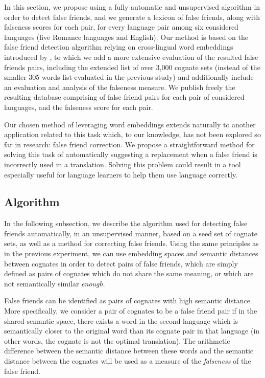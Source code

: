 \documentclass[output=paper]{langsci/langscibook}
\begin{document}
In this section, we propose using a fully automatic and unsupervised algorithm in order to detect false friends, and we generate a lexicon of false friends, along with falseness scores for each pair, for every language pair among six considered languages (five Romance languages and English). Our method is based on the false friend detection algorithm relying on cross-lingual word embeddings introduced by \citet{cognatesuban:uban2019cognates}, to which we add a more extensive evaluation of the resulted false friends pairs, including the extended list of over 3,000 cognate sets (instead of the smaller 305 words list evaluated in the previous study) and additionally include an evaluation and analysis of the falseness measure. We publish freely the resulting database comprising of false friend pairs for each pair of considered languages, and the falseness score for each pair.

Our chosen method of leveraging word embeddings extends naturally to another application related to this task which, to our knowledge, has not been explored so far in research: false friend correction. We propose a straightforward method for solving this task of automatically suggesting a replacement when a false friend is incorrectly used in a translation. Solving this problem could result in a tool especially useful for language learners to help them use language correctly.

\subsection{Algorithm}\largerpage

In the following subsection, we describe the algorithm used for detecting false friends automatically, in an unsupervised manner, based on a seed set of cognate sets, as well as a method for correcting false friends.
Using the same principles as in the previous experiment, we can use embedding spaces and semantic distances between cognates in order to detect pairs of false friends, which are simply defined as pairs of cognates which do not share the same meaning, or which are not semantically similar \textit{enough}.

False friends can be identified as pairs of cognates with high semantic distance. More specifically, we consider a pair of cognates to be a false friend pair if in the shared semantic space, there exists a word in the second language which is semantically closer to the original word than its cognate pair in that language (in other words, the cognate is not the optimal translation). The arithmetic difference between the semantic distance between these words and the semantic distance between the cognates will be used as a measure of the \textit{falseness} of the false friend. 
\end{document}
